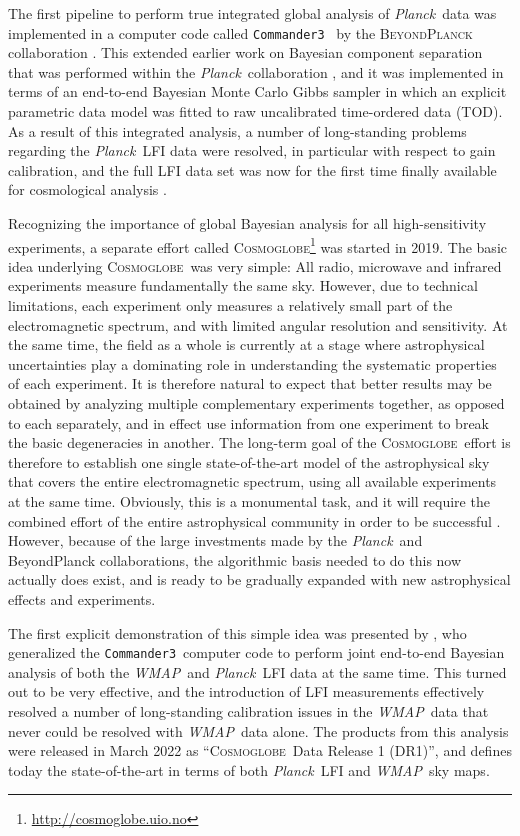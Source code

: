 \documentclass{aa}
\def\Cosmoglobe{\textsc{Cosmoglobe}}
\def\commanderthree{\texttt{Commander3}}
\def\Planck{\textit{Planck}}
\def\WMAP{\textit{WMAP}}
\begin{document}
The first pipeline to perform true integrated global analysis of \Planck\ data was implemented in a computer code called \commanderthree\ \citep{bp03} by the \textsc{BeyondPlanck} collaboration \citep{bp01}. This extended earlier work on Bayesian component separation that was performed within the \Planck\ collaboration \citep{planck2014-a12}, and it was implemented in terms of an end-to-end Bayesian Monte Carlo Gibbs sampler in which an explicit parametric data model was fitted to raw uncalibrated time-ordered data (TOD). As a result of this integrated analysis, a number of long-standing problems regarding the \Planck\ LFI data \citep{planck2016-l02} were resolved, in particular with respect to gain calibration, and the full LFI data set was now for the first time finally available for cosmological analysis \citep{bp10,bp11,bp12}.

Recognizing the importance of global Bayesian analysis for all high-sensitivity experiments, a separate effort called \Cosmoglobe\footnote{\url{http://cosmoglobe.uio.no}} was started in 2019. The basic idea underlying \Cosmoglobe\ was very simple: All radio, microwave and infrared experiments measure fundamentally the same sky. However, due to technical limitations, each experiment only measures a relatively small part of the electromagnetic spectrum, and with limited angular resolution and sensitivity. At the same time, the field as a whole is currently at a stage where astrophysical uncertainties play a dominating role in understanding the systematic properties of each experiment. It is therefore natural to expect that better results may be obtained by analyzing multiple complementary experiments together, as opposed to each separately, and in effect use information from one experiment to break the basic degeneracies in another. The long-term goal of the \Cosmoglobe\ effort is therefore to establish one single state-of-the-art model of the astrophysical sky that covers the entire electromagnetic spectrum, using all available experiments at the same time. Obviously, this is a monumental task, and it will require the combined effort of the entire astrophysical community in order to be successful \citep{bp05}. However, because of the large investments made by the \Planck\ and BeyondPlanck collaborations, the algorithmic basis needed to do this now actually does exist, and is ready to be gradually expanded with new astrophysical effects and experiments.

The first explicit demonstration of this simple idea was presented by \citet{watts2023_dr1}, who generalized the \commanderthree\ computer code to perform joint end-to-end Bayesian analysis of both the \WMAP\ and \Planck\ LFI data at the same time. This turned out to be very effective, and the introduction of LFI measurements effectively resolved a number of long-standing calibration issues in the \WMAP\ data that never could be resolved with \WMAP\ data alone. The products from this analysis were released in March 2022 as ``\Cosmoglobe\ Data Release 1 (DR1)'', and defines today the state-of-the-art in terms of both \Planck\ LFI and \WMAP\ sky maps.
\end{document}
